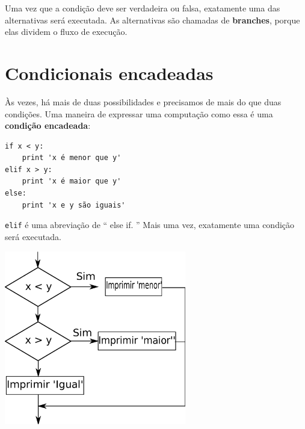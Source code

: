 Uma vez que a condição deve ser verdadeira ou falsa, exatamente uma das
alternativas será executada. As alternativas são chamadas de
{\bf branches}, porque elas dividem o fluxo de execução.


\section{Condicionais encadeadas}

Às vezes, há mais de duas possibilidades e precisamos de mais do que
duas condições. Uma maneira de expressar uma computação como essa é uma {\bf
condição encadeada}:

\beforeverb
\begin{verbatim}
if x < y:
    print 'x é menor que y'
elif x > y:
    print 'x é maior que y'
else:
    print 'x e y são iguais'
\end{verbatim}
\afterverb
\afterverb
%

{\tt elif} é uma abreviação de `` else if. '' Mais uma vez, exatamente uma
condição será executada.

\beforefig
\centerline{\includegraphics[height=3.00in]{figs2/elif.eps}}
\afterfig

